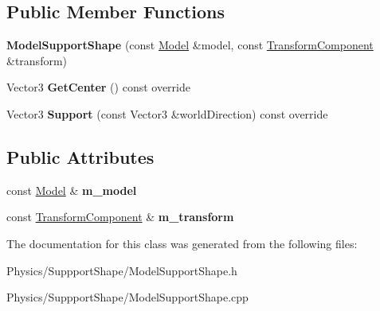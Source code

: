 \subsection*{Public Member Functions}
\begin{DoxyCompactItemize}
\item 
\mbox{\label{classModelSupportShape_a55682df74d6b772a7fe54ff762efbdbe}} 
{\bfseries Model\+Support\+Shape} (const \hyperlink{classModel}{Model} \&model, const \hyperlink{classTransformComponent}{Transform\+Component} \&transform)
\item 
\mbox{\label{classModelSupportShape_a006fee2a4fca1a9b15194512a072a8e0}} 
Vector3 {\bfseries Get\+Center} () const override
\item 
\mbox{\label{classModelSupportShape_aa15c689024a0e86594fec5461c67f808}} 
Vector3 {\bfseries Support} (const Vector3 \&world\+Direction) const override
\end{DoxyCompactItemize}
\subsection*{Public Attributes}
\begin{DoxyCompactItemize}
\item 
\mbox{\label{classModelSupportShape_a69e766fa6ed67d5d2800a6dcae40679b}} 
const \hyperlink{classModel}{Model} \& {\bfseries m\+\_\+model}
\item 
\mbox{\label{classModelSupportShape_aa75138e5ff4b94d0717a83bf73d9ff7c}} 
const \hyperlink{classTransformComponent}{Transform\+Component} \& {\bfseries m\+\_\+transform}
\end{DoxyCompactItemize}


The documentation for this class was generated from the following files\+:\begin{DoxyCompactItemize}
\item 
Physics/\+Suppport\+Shape/Model\+Support\+Shape.\+h\item 
Physics/\+Suppport\+Shape/Model\+Support\+Shape.\+cpp\end{DoxyCompactItemize}
